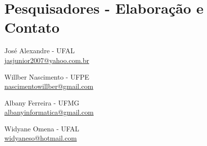 \documentclass{article}\usepackage[]{graphicx}\usepackage[]{color}
\begin{document}


\section{Pesquisadores - Elaboração e Contato}
		José Alexandre - UFAL \\
		{\color{blue}\href{mailto}{jasjunior2007@yahoo.com.br}}

\vspace{0.5cm}
		 \noindent Willber Nascimento - UFPE \\
		{\color{blue}\href{mailto}{nascimentowillber@gmail.com}}

\vspace{0.5cm}

    \noindent Albany Ferreira - UFMG \\
		{\color{blue}\href{mailto}{albanyinformatica@gmail.com}}

\vspace{0.5cm}

    \noindent Widyane Omena - UFAL \\
		{\color{blue}\href{mailto}{widyaneso@hotmail.com}}
\end{document}
